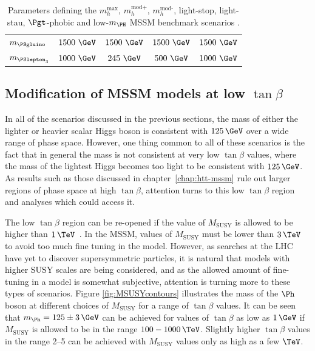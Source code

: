 \begin{table}[tbh]
\begin{tabular}{|l|c|c|c|c|}
$m_{\PSgluino}$ & $1500~\GeV$ & $1500~\GeV$  & $1500~\GeV$ & $1500~\GeV$ \\
$m_{\PSlepton_{3}}$ & $1000~\GeV$ & $245~\GeV$ & $500~\GeV$ &  $1000~\GeV$ \\
\hline
\end{tabular}
\caption[Parameters defining the $m_{h}^{\text{max}}$, $m_{h}^{\text{mod+}}$,
$m_{h}^{\text{mod-}}$, light-stop, light-stau, $\Pgt$-phobic and
low-$m_{\PH}$ MSSM benchmark scenarios.]{Parameters defining the $m_{h}^{\text{max}}$, $m_{h}^{\text{mod+}}$,
$m_{h}^{\text{mod-}}$, light-stop, light-stau, $\Pgt$-phobic and
low-$m_{\PH}$ MSSM benchmark scenarios \cite{HIG-13-021}.}
\label{tab:mssmbenchmarks}
\end{table}

\subsection{Modification of MSSM models at low $\tan\beta$}
\label{sec:lowtanbscenario}

In all of the scenarios discussed in the previous sections, the mass of either
the lighter or heavier scalar Higgs boson is consistent with $125\,\GeV$ over a
wide range of phase space. However, one thing common to all of these scenarios
is the fact that in general the mass is not consistent at very low $\tan\beta$
values, where the mass of the lightest Higgs becomes too light to be consistent
with $125\,\GeV$. As results such as those discussed in chapter~\ref{chap:htt-mssm} 
rule out larger regions of phase space at high $\tan\beta$, attention turns to this low
$\tan\beta$ region and analyses which could access it.

The low $\tan\beta$ region can be re-opened if the value of $M_{\text{SUSY}}$ is
allowed to be higher than $1\,\TeV$~\cite{Djouadi:2013vqa}. In the \ac{MSSM}, values of
$M_{\text{SUSY}}$ must be lower than $3\,\TeV$ to avoid too much fine tuning in
the model. However, as searches at the LHC have yet to discover supersymmetric
particles, it is natural that models with higher \ac{SUSY} scales are being
considered, and as the allowed amount of fine-tuning in a model is somewhat
subjective, attention is turning more to these types of scenarios. Figure
\ref{fig:MSUSYcontours} illustrates the mass of the $\Ph$ boson at different
choices of $M_{\text{SUSY}}$ for a range of $\tan\beta$ values. It can be seen
that $m_{\Ph} = 125\pm 3\,\GeV$ can be achieved for values of $\tan\beta$ as low
as $1\,\GeV$ if $M_{\text{SUSY}}$ is allowed to be in the range $100-1000\,\TeV$.
Slightly higher $\tan\beta$ values in the range 2--5 can be achieved with
$M_{\text{SUSY}}$ values only as high as a few $\TeV$. 

